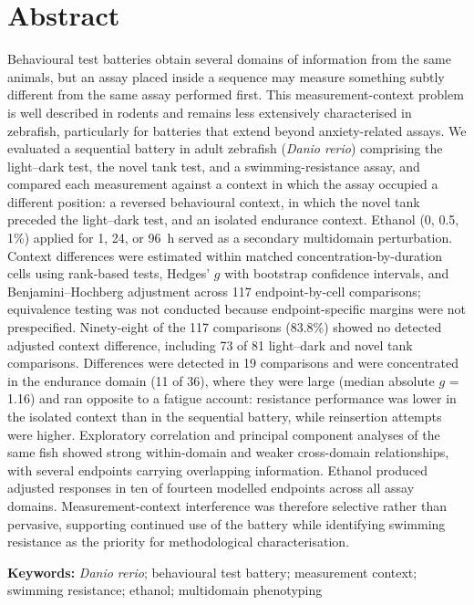 \documentclass[12pt,a4paper]{article}
\begin{document}
\section*{Abstract}

Behavioural test batteries obtain several domains of information from the same animals, but an assay placed inside a sequence may measure something subtly different from the same assay performed first. This measurement-context problem is well described in rodents and remains less extensively characterised in zebrafish, particularly for batteries that extend beyond anxiety-related assays. We evaluated a sequential battery in adult zebrafish (\textit{Danio rerio}) comprising the light--dark test, the novel tank test, and a swimming-resistance assay, and compared each measurement against a context in which the assay occupied a different position: a reversed behavioural context, in which the novel tank preceded the light--dark test, and an isolated endurance context. Ethanol (0, 0.5, 1\%) applied for 1, 24, or 96~h served as a secondary multidomain perturbation. Context differences were estimated within matched concentration-by-duration cells using rank-based tests, Hedges' $g$ with bootstrap confidence intervals, and Benjamini--Hochberg adjustment across 117 endpoint-by-cell comparisons; equivalence testing was not conducted because endpoint-specific margins were not prespecified. Ninety-eight of the 117 comparisons (83.8\%) showed no detected adjusted context difference, including 73 of 81 light--dark and novel tank comparisons. Differences were detected in 19 comparisons and were concentrated in the endurance domain (11 of 36), where they were large (median absolute $g$ = 1.16) and ran opposite to a fatigue account: resistance performance was lower in the isolated context than in the sequential battery, while reinsertion attempts were higher. Exploratory correlation and principal component analyses of the same fish showed strong within-domain and weaker cross-domain relationships, with several endpoints carrying overlapping information. Ethanol produced adjusted responses in ten of fourteen modelled endpoints across all assay domains. Measurement-context interference was therefore selective rather than pervasive, supporting continued use of the battery while identifying swimming resistance as the priority for methodological characterisation.

\vspace{1em}
\noindent\textbf{Keywords:} \textit{Danio rerio}; behavioural test battery; measurement context; swimming resistance; ethanol; multidomain phenotyping
\end{document}
